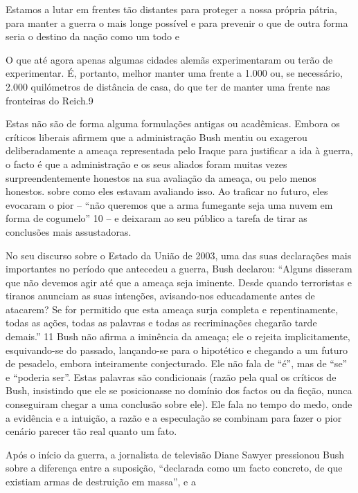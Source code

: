 \par 
Estamos a lutar em frentes tão distantes para proteger a nossa própria pátria, para manter a guerra o mais longe possível e para prevenir o que de outra forma seria o destino da nação como um todo e
 \par 
O que até agora apenas algumas cidades alemãs experimentaram ou terão de experimentar. É, portanto, melhor manter uma frente a {\color{blue}1}.{\color{blue}000} ou, se necessário, {\color{blue}2}.{\color{blue}000} quilómetros de distância de casa, do que ter de manter uma frente nas fronteiras do Reich.{\color{blue}9}
 \par 
Estas não são de forma alguma formulações antigas ou acadêmicas. Embora os críticos liberais afirmem que a administração Bush mentiu ou exagerou deliberadamente a ameaça representada pelo Iraque para justificar a ida à guerra, o facto é que a administração e os seus aliados foram muitas vezes surpreendentemente honestos na sua avaliação da ameaça, ou pelo menos honestos. sobre como eles estavam avaliando isso. Ao traficar no futuro, eles evocaram o pior – “não queremos que a arma fumegante seja uma nuvem em forma de cogumelo” {\color{blue}10} – e deixaram ao seu público a tarefa de tirar as conclusões mais assustadoras.
 \par 
No seu discurso sobre o Estado da União de 2003, uma das suas declarações mais importantes no período que antecedeu a guerra, Bush declarou: “Alguns disseram que não devemos agir até que a ameaça seja iminente. Desde quando terroristas e tiranos anunciam as suas intenções, avisando-nos educadamente antes de atacarem? Se for permitido que esta ameaça surja completa e repentinamente, todas as ações, todas as palavras e todas as recriminações chegarão tarde demais.” {\color{blue}11} Bush não afirma a iminência da ameaça; ele o rejeita implicitamente, esquivando-se do passado, lançando-se para o hipotético e chegando a um futuro de pesadelo, embora inteiramente conjecturado. Ele não fala de “é”, mas de “se” e “poderia ser”. Estas palavras são condicionais (razão pela qual os críticos de Bush, insistindo que ele se posicionasse no domínio dos factos ou da ficção, nunca conseguiram chegar a uma conclusão sobre ele). Ele fala no tempo do medo, onde a evidência e a intuição, a razão e a especulação se combinam para fazer o pior cenário parecer tão real quanto um fato.
 \par 
Após o início da guerra, a jornalista de televisão Diane Sawyer pressionou Bush sobre a diferença entre a suposição, “declarada como um facto concreto, de que existiam armas de destruição em massa”, e a

